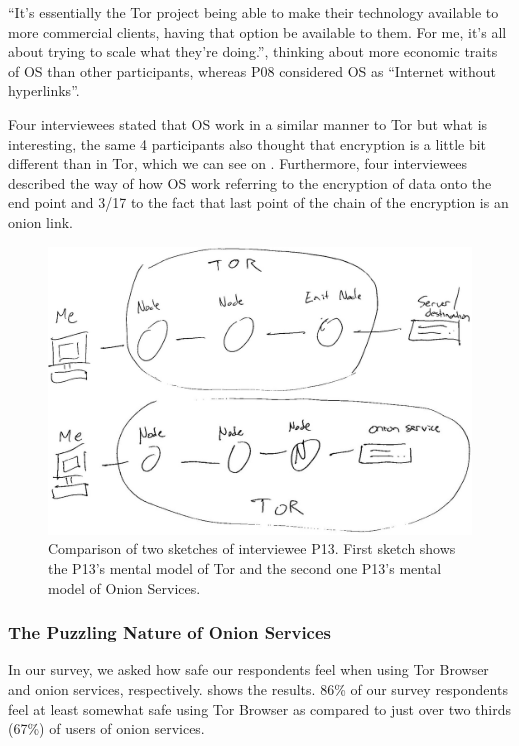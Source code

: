 “It's essentially the Tor project being able to make their technology available to more commercial clients, having that option be available to them. For me, it's all about trying to scale what they're doing.”, thinking about more economic traits of OS than other participants, whereas P08 considered OS as “Internet without hyperlinks”.

Four interviewees stated that OS work in a similar manner to Tor but what is interesting, the same 4 participants also thought that encryption is a little bit different than in Tor, which we can see on . Furthermore, four interviewees described the way of how OS work referring to the encryption of data onto the end point and 3/17 to the fact that last point of the chain of the encryption is an onion link. 


\begin{figure}[!ht]
        \centering
        \includegraphics[width=0.8\linewidth]{figures/P13bothSketches.jpg}
        \caption{Comparison of two sketches of interviewee P13. First sketch shows the P13’s mental model of Tor and the second one P13’s mental model of Onion Services. }
        \label{fig:toros-sketch}
\end{figure}




\subsubsection{The Puzzling Nature of Onion Services}
In our survey, we asked how safe our
respondents feel when using Tor Browser and onion services, respectively.
 shows the results.  
86\% of our survey respondents feel at least somewhat safe using Tor Browser as compared to just over two thirds (67\%) of users of onion services.

